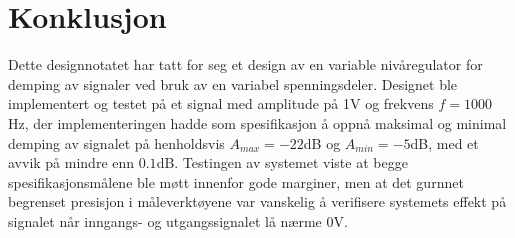 \section{Konklusjon}
\label{konklusjon}

Dette designnotatet har tatt for seg et design av en variable nivåregulator for demping av 
signaler ved bruk av en variabel spenningsdeler. Designet ble implementert og testet på et signal
med amplitude på 1V og frekvens $f = 1000$Hz, der implementeringen hadde som spesifikasjon å oppnå 
maksimal og minimal demping av signalet på henholdsvis $A_{max} = -22$dB og $A_{min} = -5$dB, med et 
avvik på mindre enn $0.1$dB. Testingen av systemet viste at begge spesifikasjonsmålene ble møtt innenfor 
gode marginer, men at det gurnnet begrenset presisjon i måleverktøyene var vanskelig å verifisere systemets 
effekt på signalet når inngangs- og utgangssignalet lå nærme 0V.
